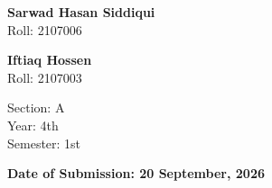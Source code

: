 \documentclass[10pt,a4paper]{article}
\begin{document}
\begin{titlepage}
\begin{minipage}[t]{0.32\textwidth}
\textbf{Sarwad Hasan Siddiqui}\\
Roll: 2107006

\vspace{0.35cm}
\textbf{Iftiaq Hossen}\\
Roll: 2107003

\vspace{0.4cm}
Section: A\\
Year: 4th\\
Semester: 1st
\end{minipage}

\vfill
{\large\bfseries Date of Submission: 20 September, 2026}
\vspace*{0.5cm}
\end{titlepage}
\restoregeometry

{\small\tableofcontents}
\small
\end{document}
